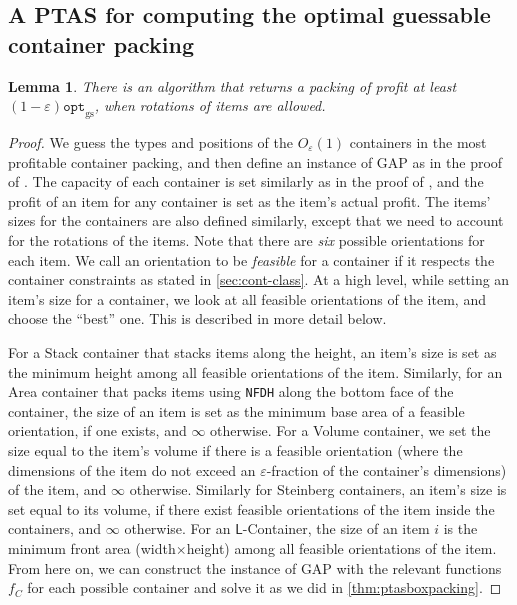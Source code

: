 \documentclass[10pt,a4paper]{amsart}
\renewcommand{\epsilon}{\varepsilon} %
\newcommand{\NFDH}{\texttt{NFDH}\xspace}
\newtheorem{lemma}[theorem]{Lemma}
\theoremstyle{definition}
\newcommand{\alg}{\mathtt{opt}_{\mathrm{gs}}}
\newcommand{\LContainer}{$\mathsf{L}$-Container}
\begin{document}
\subsection{A PTAS for computing the optimal guessable container packing}
\begin{lemma}
\label{lem:gapwithrotation}
    There is an algorithm that returns a packing of profit at least~$(1-\epsilon)\alg$, when rotations of items are allowed.
\end{lemma}
\begin{proof}
    We guess the types and positions of the $O_{\epsilon}(1)$ containers in the most profitable container packing, and then define an instance of GAP as in the proof of . The capacity of each container is set similarly as in the proof of , and the profit of an item for any container is set as the item's actual profit. The items' sizes for the containers are also defined similarly, except that we need to account for the rotations of the items. Note that there are {\em six}  possible orientations for each item. We call an orientation to be \textit{feasible} for a container if it respects the container constraints as stated in \cref{sec:cont-class}. At a high level, while setting an item's size for a container, we look at all feasible orientations of the item, and choose the ``best'' one. This is described in more detail below.

    For a Stack container that stacks items along the height, an item's size is set as the minimum height among all feasible orientations of the item. Similarly, for an Area container that packs items using \NFDH along the bottom face of the container, the size of an item is set as the minimum base area of a feasible orientation, if one exists, and $\infty$ otherwise. For a Volume container, we set the size equal to the item's volume if there is a feasible orientation (where the dimensions of the item do not exceed an $\epsilon$-fraction of the container's dimensions) of the item, and $\infty$ otherwise. Similarly for Steinberg containers, an item's size is set equal to its volume, if there exist feasible orientations of the item inside the containers, and $\infty$ otherwise.
    For an \LContainer{}, the size of an item $i$ is the minimum front area (width$\times$height) among all feasible orientations of the item. From here on, we can construct the instance of GAP with the relevant functions $f_C$ for each possible container and solve it as we did in \cref{thm:ptasboxpacking}.
\end{proof}
\end{document}
